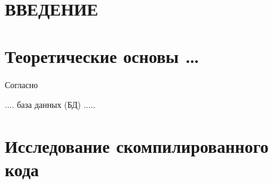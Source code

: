 \documentclass{studrep}
\begin{document}
\tableofcontents

\chapter*{ВВЕДЕНИЕ}
\label{chap:intro}

\chapter{Теоретические основы \ldots}

Согласно \cite{bratko90}

.... база данных (БД) .....


\chapter{Исследование скомпилированного кода}
\end{document}
